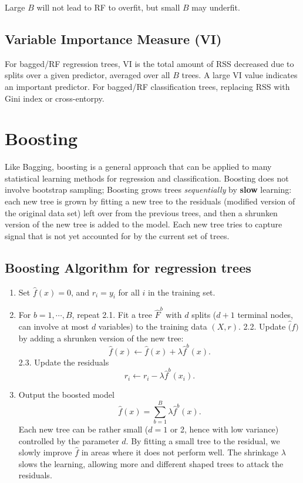 \documentclass[
  letterpaper,
  DIV=11,
  numbers=noendperiod]{scrreprt}
\providecommand{\tightlist}{%
  \setlength{\itemsep}{0pt}\setlength{\parskip}{0pt}}\usepackage{longtable,booktabs,array}
\begin{document}
Large \(B\) will not lead to RF to overfit, but small \(B\) may
underfit.

\subsection{Variable Importance Measure
(VI)}\label{variable-importance-measure-vi}

For bagged/RF regression trees, VI is the total amount of RSS decreased
due to splits over a given predictor, averaged over all \(B\) trees. A
large VI value indicates an important predictor. For bagged/RF
classification trees, replacing RSS with Gini index or cross-entorpy.

\section{Boosting}\label{boosting}

Like Bagging, boosting is a general approach that can be applied to many
statistical learning methods for regression and classification. Boosting
does not involve bootstrap sampling; Boosting grows trees
\emph{sequentially} by \textbf{slow} learning: each new tree is grown by
fitting a new tree to the residuals (modified version of the original
data set) left over from the previous trees, and then a shrunken version
of the new tree is added to the model. Each new tree tries to capture
signal that is not yet accounted for by the current set of trees.

\subsection{Boosting Algorithm for regression
trees}\label{boosting-algorithm-for-regression-trees}

\begin{enumerate}
\def\labelenumi{\arabic{enumi}.}
\tightlist
\item
  Set \(\hat{f}(x)=0\), and \(r_i=y_i\) for all \(i\) in the training
  set.
\item
  For \(b=1, \cdots, B\), repeat 2.1. Fit a tree \(\hat{F}^b\) with
  \(d\) splits (\(d+1\) terminal nodes, can involve at most \(d\)
  variables) to the training data \((X,r)\). 2.2. Update \(\hat(f)\) by
  adding a shrunken version of the new tree: \[ 
  \hat{f}(x) \leftarrow \hat{f}(x) +\lambda \hat{f}^b(x).
  \] 2.3. Update the residuals \[
  r_i \leftarrow r_i -\lambda \hat{f}^b(x_i).
  \]
\item
  Output the boosted model \[ 
    \hat{f}(x)=\sum_{b=1}^B \lambda \hat{f}^b (x). 
   \] Each new tree can be rather small (\(d=1\) or 2, hence with low
  variance) controlled by the parameter \(d\). By fitting a small tree
  to the residual, we slowly improve \(\hat{f}\) in areas where it does
  not perform well. The shrinkage \(\lambda\) slows the learning,
  allowing more and different shaped trees to attack the residuals.
\end{enumerate}
\end{document}
